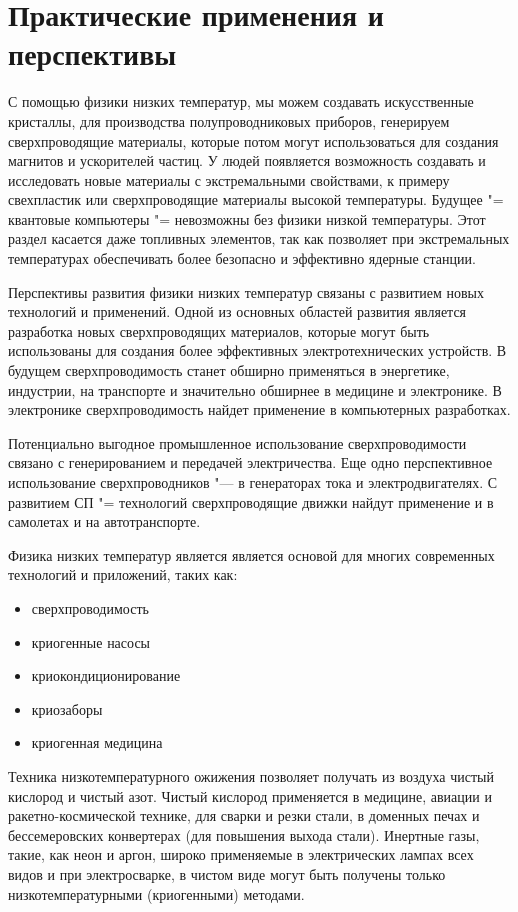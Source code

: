 \documentclass[bachelor,och,referat]{SCWorks_corrected}
\begin{document}
\section{Практические применения и перспективы}
С помощью физики низких температур, мы можем создавать искусственные кристаллы, для производства полупроводниковых приборов, генерируем сверхпроводящие материалы, которые потом могут использоваться для создания магнитов и ускорителей частиц. У людей появляется возможность создавать и исследовать новые материалы с экстремальными свойствами, к примеру свехпластик или сверхпроводящие материалы высокой температуры. Будущее "= квантовые компьютеры "= невозможны без физики низкой температуры. Этот раздел касается даже топливных элементов, так как позволяет при экстремальных температурах обеспечивать более безопасно и эффективно ядерные станции.

Перспективы развития физики низких температур связаны с развитием новых технологий и применений. Одной из основных областей развития является разработка новых сверхпроводящих материалов, которые могут быть использованы для создания более эффективных электротехнических устройств. В будущем сверхпроводимость станет обширно применяться в энергетике, индустрии, на транспорте и значительно обширнее в медицине и электронике. В электронике сверхпроводимость найдет применение в компьютерных разработках. 

Потенциально выгодное промышленное использование сверхпроводимости связано с генерированием и передачей электричества. Еще одно перспективное использование сверхпроводников "--- в генераторах тока и электродвигателях. С развитием СП "= технологий сверхпроводящие движки найдут применение и в самолетах и на автотранспорте.

\conclusion
Физика низких температур является является основой для многих современных технологий и приложений, таких как:\begin{itemize}
    \item сверхпроводимость
    \item криогенные насосы
    \item криокондиционирование
    \item криозаборы\nocite{*}
    \item криогенная медицина
\end{itemize} 
Техника низкотемпературного ожижения позволяет получать из воздуха чистый кислород и чистый азот. Чистый кислород применяется в медицине, авиации и ракетно-космической технике, для сварки и резки стали, в доменных печах и бессемеровских конвертерах (для повышения выхода стали). Инертные газы, такие, как неон и аргон, широко применяемые в электрических лампах всех видов и при электросварке, в чистом виде могут быть получены только низкотемпературными (криогенными) методами.
\end{document}
